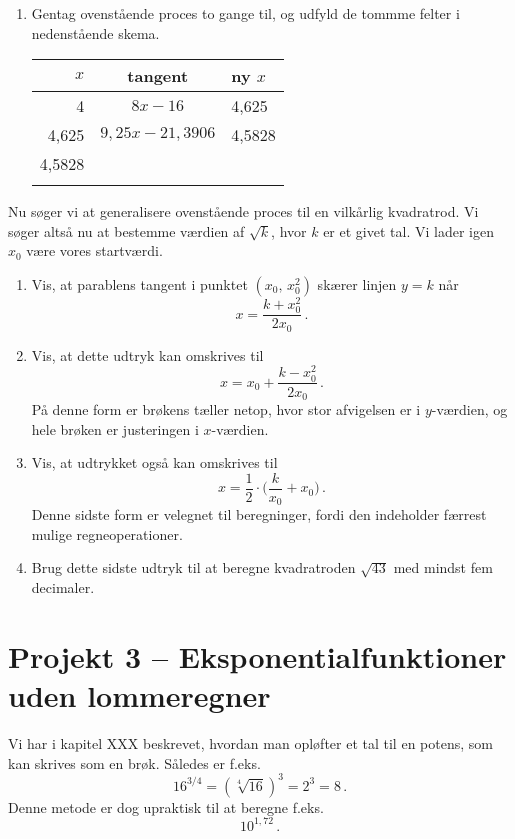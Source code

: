 \documentclass[12pt,oneside,a4paper]{article}
\theoremstyle{plain}
\begin{document}
\begin{enumerate}[label=(\alph*), resume]
    \item Gentag ovenstående proces to gange til, og udfyld de tommme felter i
        nedenstående skema.
        \begin{center}
            \begin{tabular}{|r|c|l|}
\hline
                $x$ & tangent & ny $x$ \\
                \hline
                4 & $8x-16$ & 4,625 \\
                \hline
                4,625 & $9,25x-21,3906$ & 4,5828 \\
                \hline
                4,5828 & & \\
                \hline
                 & & \\
                \hline
            \end{tabular}
        \end{center}
\end{enumerate}

Nu søger vi at generalisere ovenstående proces til en vilkårlig 
kvadratrod. Vi søger altså nu at bestemme værdien af $\sqrt{k}$, hvor
$k$ er et givet tal. Vi lader igen $x_0$ være vores startværdi.

\begin{enumerate}[label=(\alph*), resume]
    \item Vis, at parablens tangent i punktet $(x_0,\,x_0^2)$ 
        skærer linjen $y=k$ når
        \[
            x = \frac{k+x_0^2}{2x_0}\,.
        \]
    \item Vis, at dette udtryk kan omskrives til 
        \[
            x = x_0 + \frac{k-x_0^2}{2x_0}\,.
        \]
    På denne form er brøkens tæller netop, hvor stor afvigelsen er i $y$-værdien,
        og hele brøken er justeringen i $x$-værdien.
    \item Vis, at udtrykket også kan omskrives til
        \[
            x = \frac12 \cdot \Big(\frac{k}{x_0} + x_0\Big) \,.
        \]
    Denne sidste form er velegnet til beregninger, fordi den indeholder færrest
        mulige regneoperationer.

    \item Brug dette sidste udtryk til at beregne kvadratroden $\sqrt{43}$ med
        mindst fem decimaler.
\end{enumerate}


\section*{Projekt 3 -- Eksponentialfunktioner uden lommeregner}
Vi har i kapitel XXX beskrevet, hvordan man opløfter et tal til en potens, som
kan skrives som en brøk. Således er f.eks.
\[
    16^{3/4} = (\sqrt[4]{16})^3 = 2^3 = 8 \,.
\]
Denne metode er dog upraktisk til at beregne f.eks.
\[
    10^{1,72} \,.
\]
\end{document}
